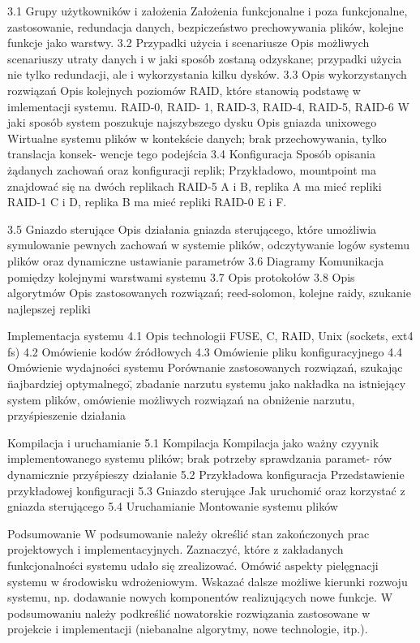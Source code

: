 3.1 Grupy użytkowników i założenia
Założenia funkcjonalne i poza funkcjonalne, zastosowanie, redundacja danych, bezpiczeństwo prechowywania plików, kolejne funkcje jako warstwy.
3.2 Przypadki użycia i scenariusze
Opis możliwych scenariuszy utraty danych i w jaki sposób zostaną odzyskane; przypadki użycia nie tylko
redundacji, ale i wykorzystania kilku dysków.
3.3 Opis wykorzystanych rozwiązań
Opis kolejnych poziomów RAID, które stanowią podstawę w imlementacji systemu. RAID-0, RAID-
1, RAID-3, RAID-4, RAID-5, RAID-6 W jaki sposób system poszukuje najszybszego dysku Opis gniazda
unixowego Wirtualne systemu plików w kontekście danych; brak przechowywania, tylko translacja konsek-
wencje tego podejścia
3.4 Konfiguracja
Sposób opisania żądanych zachowań oraz konfiguracji replik; Przykładowo, mountpoint ma znajdować
się na dwóch replikach RAID-5 A i B, replika A ma mieć repliki RAID-1 C i D, replika B ma mieć repliki
RAID-0 E i F.

3.5 Gniazdo sterujące
Opis działania gniazda sterującego, które umożliwia symulowanie pewnych zachowań w systemie plików,
odczytywanie logów systemu plików oraz dynamiczne ustawianie parametrów
3.6 Diagramy
Komunikacja pomiędzy kolejnymi warstwami systemu
3.7 Opis protokołów
3.8 Opis algorytmów
Opis zastosowanych rozwiązań; reed-solomon, kolejne raidy, szukanie najlepszej repliki


Implementacja systemu
4.1 Opis technologii
FUSE, C, RAID, Unix (sockets, ext4 fs)
4.2 Omówienie kodów źródłowych
4.3 Omówienie pliku konfiguracyjnego
4.4 Omówienie wydajności systemu
Porównanie zastosowanych rozwiązań, szukając n̈ajbardziej optymalnego,̈ zbadanie narzutu systemu jako
nakładka na istniejący system plików, omówienie możliwych rozwiązań na obniżenie narzutu, przyśpieszenie działania


Kompilacja i uruchamianie
5.1 Kompilacja
Kompilacja jako ważny czyynik implementowanego systemu plików; brak potrzeby sprawdzania paramet-
rów dynamicznie przyśpieszy działanie
5.2 Przykładowa konfiguracja
Przedstawienie przykładowej konfiguracji
5.3 Gniazdo sterujące
Jak uruchomić oraz korzystać z gniazda sterującego
5.4 Uruchamianie
Montowanie systemu plików


Podsumowanie
W podsumowanie należy określić stan zakończonych prac projektowych i implementacyjnych. Zaznaczyć,
które z zakładanych funkcjonalności systemu udało się zrealizować. Omówić aspekty pielęgnacji systemu
w środowisku wdrożeniowym. Wskazać dalsze możliwe kierunki rozwoju systemu, np. dodawanie nowych
komponentów realizujących nowe funkcje.
W podsumowaniu należy podkreślić nowatorskie rozwiązania zastosowane w projekcie i implementacji
(niebanalne algorytmy, nowe technologie, itp.).
